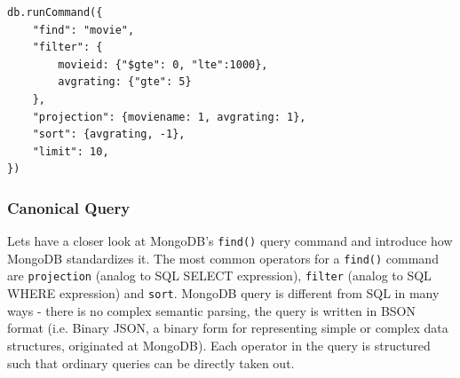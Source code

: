 \begin{lstlisting}[caption={MongoDB find() query example}, label={alg:queryexample}]
db.runCommand({
    "find": "movie",
    "filter": { 
        movieid: {"$gte": 0, "lte":1000}, 
        avgrating: {"gte": 5} 
    },
    "projection": {moviename: 1, avgrating: 1},
    "sort": {avgrating, -1},
    "limit": 10,
})
\end{lstlisting}

\subsubsection{Canonical Query} \label{sec:canonical-query}

Lets have a closer look at MongoDB's \verb|find()| query command and introduce 
how MongoDB standardizes it.
The most common operators for a \verb|find()| command are \verb|projection| (analog to SQL SELECT expression), \verb|filter| (analog to SQL WHERE expression) and \verb|sort|. MongoDB query is different from SQL in many ways - there is no complex semantic parsing, the query is written in BSON format (i.e. Binary JSON, a binary form for representing simple or complex data structures, originated at MongoDB). Each operator in the query is structured such that ordinary queries can be directly taken out.

